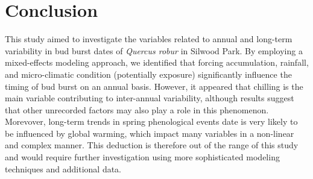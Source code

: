 \documentclass{article}
\begin{document}
\vspace{-0.5cm}
\section{Conclusion}\label{sec:conclusion}
This study aimed to investigate the variables related to annual and long-term variability in bud burst dates of \textit{Quercus robur} in Silwood Park. By employing a mixed-effects modeling approach, we identified that forcing accumulation, rainfall, and micro-climatic condition (potentially exposure) significantly influence the timing of bud burst on an annual basis. However, it appeared that chilling is the main variable contributing to inter-annual variability, although results suggest that other unrecorded factors may also play a role in this phenomenon. Morevover, long-term trends in spring phenological events date is very likely to be influenced by global warming, which impact many variables in a non-linear and complex manner. This deduction is therefore out of the range of this study and would require further investigation using more sophisticated modeling techniques and additional data.

\printbibliography
\end{document}
